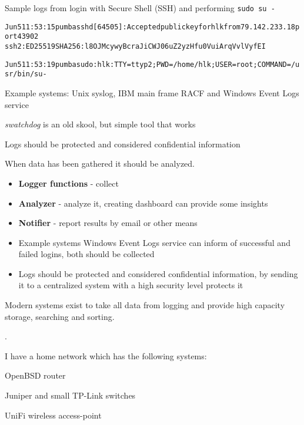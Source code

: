 \documentclass[Screen16to9,17pt]{foils}
\begin{document}


Sample logs from login with Secure Shell (SSH) and performing \verb+sudo su -+
\begin{alltt}\footnotesize
Jun  5 11:53:15 pumba sshd[64505]: Accepted publickey for hlk from 79.142.233.18 port 43902
 ssh2: ED25519 SHA256:l8OJMcywyBcraJiCWJ06uZ2yzHfu0VuiArqVvlVyfEI

Jun  5 11:53:19 pumba sudo:      hlk : TTY=ttyp2 ; PWD=/home/hlk ; USER=root ; COMMAND=/usr/bin/su -
\end{alltt}

\begin{list1}
\item Example systems: Unix syslog, IBM main frame RACF and Windows Event Logs service
\item \emph{swatchdog} is an old skool, but simple tool that works
\item Logs should be protected and considered confidential information
\end{list1}




When data has been gathered it should be analyzed.

\begin{itemize}
\item {\bf Logger functions} - collect
\item {\bf Analyzer} - analyze it, creating dashboard can provide some insights
\item {\bf Notifier} - report results by email or other means
\item Example systems Windows Event Logs service can inform of successful and failed logins, both should be collected
\item Logs should be protected and considered confidential information, by sending it to a centralized system with a high security level protects it
\end{itemize}

Modern systems exist to take all data from logging and provide high capacity storage, searching and sorting.



.

\begin{list1}
\item I have a home network which has the following systems:
\begin{list2}
\item OpenBSD router
\item Juniper and small TP-Link switches
\item UniFi wireless access-point
\end{list2}
\end{list1}
\end{document}
